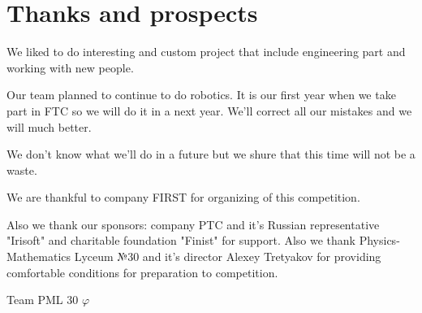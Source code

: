 
\section{Thanks and prospects} 
    We liked to do interesting and custom project that include engineering part and working with new people.
    
    Our team planned to continue to do robotics. It is our first year when we take part in FTC so we will do it in a next year. We'll correct all our mistakes and we will much better.
    
    We don't know what we'll do in a future but we shure that this time will not be a waste.
    
    We are thankful to company FIRST for organizing of this competition.
    
    Also we thank our sponsors: company PTC and it's Russian representative "Irisoft" and charitable foundation "Finist" for support. Also we thank Physics-Mathematics Lyceum №30 and it's director Alexey Tretyakov for providing comfortable conditions for preparation to competition.
   
    
    \begin{center}
      Team PML 30 ${\varphi}$
    \end{center}
    
    \vspace{0.5em}
    
    \begin{figure}[H]
    	\begin{minipage}[h]{0.47\linewidth}
    	\end{minipage}
    	\hfill
    	\begin{minipage}[h]{0.47\linewidth}
    	\end{minipage}
    \end{figure}
    
